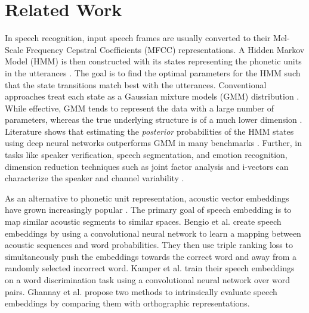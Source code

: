 \documentclass{article}
\begin{document}
\section{Related Work}
In speech recognition, input speech frames are usually converted to their Mel-Scale Frequency Cepstral Coefficients (MFCC) \citep{ittichaichareon2012speech} representations. A Hidden Markov Model (HMM) is then constructed with its states representing the phonetic units in the utterances \citep{bengio2014word}. The goal is to find the optimal parameters for the HMM such that the state transitions match best with the utterances. Conventional approaches treat each state as a Gaussian mixture models (GMM) distribution \citep{saini2013automatic}. While effective, GMM tends to represent the data with a large number of parameters, whereas the true underlying structure is of a much lower dimension \citep{hinton2012deep}. Literature shows that estimating the \emph{posterior} probabilities of the HMM states using deep neural networks outperforms GMM in many benchmarks \citep{hinton2012deep}. Further, in tasks like speaker verification, speech segmentation, and emotion recognition, dimension reduction techniques such as joint factor analysis and i-vectors can characterize the speaker and channel variability \citep{kenny2014joint,garimella2015robust,chen2011applying,chen2013emotional,andrew2014improve,karanasou2014adaptation}.

As an alternative to phonetic unit representation, acoustic vector embeddings have grown increasingly popular \citep{bengio2014word,kamper2016deep,ghannay2016evaluation}. The primary goal of speech embedding is to map similar acoustic segments to similar spaces. Bengio et al. \citep{bengio2014word} create speech embeddings by using a convolutional neural network to learn a mapping between acoustic sequences and word probabilities. They then use triple ranking loss to simultaneously push the embeddings towards the correct word and away from a randomly selected incorrect word. Kamper et al. \citep{kamper2016deep} train their speech embeddings on a word discrimination task using a convolutional neural network over word pairs. Ghannay et al. \citep{ghannay2016evaluation} propose two methods to intrinsically evaluate speech embeddings by comparing them with orthographic representations.
\end{document}
